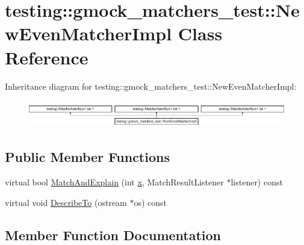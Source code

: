 \hypertarget{classtesting_1_1gmock__matchers__test_1_1_new_even_matcher_impl}{}\section{testing\+::gmock\+\_\+matchers\+\_\+test\+::New\+Even\+Matcher\+Impl Class Reference}
\label{classtesting_1_1gmock__matchers__test_1_1_new_even_matcher_impl}
Inheritance diagram for testing\+::gmock\+\_\+matchers\+\_\+test\+::New\+Even\+Matcher\+Impl\+:\begin{figure}[H]
\begin{center}
\leavevmode
\includegraphics[height=1.200429cm]{de/d59/classtesting_1_1gmock__matchers__test_1_1_new_even_matcher_impl}
\end{center}
\end{figure}
\subsection*{Public Member Functions}
\begin{DoxyCompactItemize}
\item 
virtual bool \mbox{\hyperlink{classtesting_1_1gmock__matchers__test_1_1_new_even_matcher_impl_a56819af55d88569fdfaa51b937f76337}{Match\+And\+Explain}} (int \mbox{\hyperlink{_obj__test_2lib_2googletest-master_2googlemock_2test_2gmock-matchers__test_8cc_a6150e0515f7202e2fb518f7206ed97dc}{x}}, Match\+Result\+Listener $\ast$listener) const
\item 
virtual void \mbox{\hyperlink{classtesting_1_1gmock__matchers__test_1_1_new_even_matcher_impl_aece368c865501da4b30620d06a2690cd}{Describe\+To}} (ostream $\ast$os) const
\end{DoxyCompactItemize}


\subsection{Member Function Documentation}
\mbox{\label{classtesting_1_1gmock__matchers__test_1_1_new_even_matcher_impl_aece368c865501da4b30620d06a2690cd}} 
